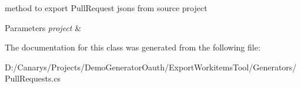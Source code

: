 method to export Pull\+Request jsons from source project 


\begin{DoxyParams}{Parameters}
{\em project} & \\
\hline
\end{DoxyParams}


The documentation for this class was generated from the following file\+:\begin{DoxyCompactItemize}
\item 
D\+:/\+Canarys/\+Projects/\+Demo\+Generator\+Oauth/\+Export\+Workitems\+Tool/\+Generators/Pull\+Requests.\+cs\end{DoxyCompactItemize}
